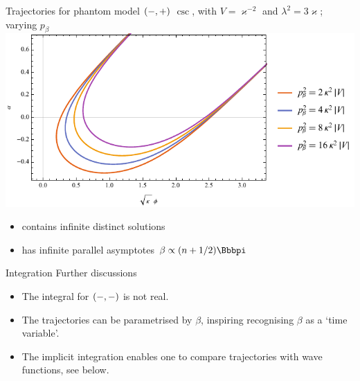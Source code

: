 \documentclass[9pt]{beamer}
\begin{document}
\begin{frame}%
{Trajectories for phantom model ${\left(-,+\right)}$}%
{$\csc$, with $V = \varkappa^{-2}$ and
$\lambda^2 = 3\varkappa$; varying $p_\beta$}
\includegraphics[width=\textwidth]{../plots.nb/csc_pbet_l.pdf}
\begin{itemize}
	\item contains infinite distinct solutions
	\item has infinite parallel asymptotes $\beta \propto \rbr{n+1/2}\pp $
\end{itemize}
\end{frame}

\begin{frame}%
{Integration}%
{Further discussions}
\begin{itemize}

\item The integral for ${\left(-,-\right)}$ is not real.

\item The trajectories can be parametrised by $\beta$, inspiring recognising
$\beta$ as a `time variable'.

\item The implicit integration enables one to compare trajectories with wave 
functions, see below.
\end{itemize}
\end{frame}
\end{document}
